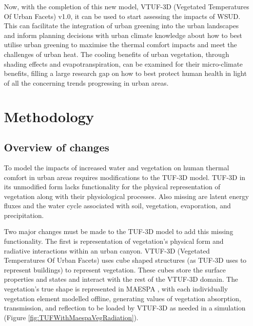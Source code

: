 \documentclass[final,3p,times,authoryear]{elsarticle}
\begin{document}
Now, with the completion of this new model, VTUF-3D (Vegetated Temperatures Of Urban Facets) v1.0, it can be used to start assessing the impacts of WSUD. This can facilitate the integration of urban greening into the urban landscapes and inform planning decisions with urban climate knowledge about how to best utilise urban greening to maximise the thermal comfort impacts and meet the challenges of urban heat. The cooling benefits of urban vegetation, through shading effects and evapotranspiration, can be examined for their micro-climate benefits, filling a large research gap on how to best protect human health in light of all the concerning trends progressing in urban areas.

\section{Methodology}\label{sec:method}

\subsection{Overview of changes}\label{sec:DesignOverview}

To model the impacts of increased water and vegetation on human thermal comfort in urban areas requires modifications to the TUF-3D \citep{Krayenhoff2007} model. TUF-3D in its unmodified form lacks functionality for the physical representation of vegetation along with their physiological processes. Also missing are latent energy fluxes and the water cycle associated with soil, vegetation, evaporation, and precipitation. 

Two major changes must be made to the TUF-3D model to add this missing functionality. The first is representation of vegetation's physical form and radiative interactions within an urban canyon. VTUF-3D (Vegetated Temperatures Of Urban Facets) uses cube shaped structures (as TUF-3D uses to represent buildings) to represent vegetation. These cubes store the surface properties and states and interact with the rest of the VTUF-3D domain. The vegetation's true shape is represented in MAESPA \citep{Duursma2012}, with each individually vegetation element modelled offline, generating values of vegetation absorption, transmission, and reflection to be loaded by VTUF-3D as needed in a simulation (Figure \ref{fig:TUFWithMaespaVegRadiation}).  
\end{document}
